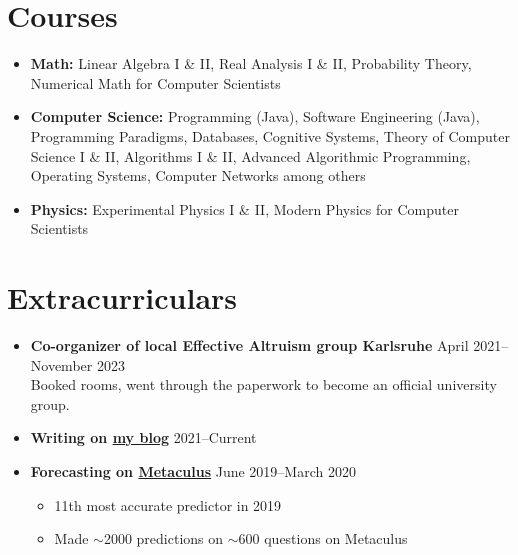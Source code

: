 \documentclass[letterpaper, 9pt]{article}
\begin{document}
\section*{Courses}
\begin{itemize}
    \item \textbf{Math:} Linear Algebra I \& II, Real Analysis I \& II, Probability Theory, Numerical Math for Computer Scientists
    \item \textbf{Computer Science:} Programming (Java), Software Engineering (Java), Programming Paradigms, Databases, Cognitive Systems, Theory of Computer Science I \& II, Algorithms I \& II, Advanced Algorithmic Programming, Operating Systems, Computer Networks among others
    \item \textbf{Physics:} Experimental Physics I \& II, Modern Physics for Computer Scientists
\end{itemize}


\section*{Extracurriculars}
  \begin{itemize}
      \item {\textbf{Co-organizer of local Effective Altruism group Karlsruhe}} \hfill April 2021--November 2023 \\
      {Booked rooms, went through the paperwork to become an official university group.}
      \item {\textbf{Writing on \href{https://www.tassiloneubauer.com/}{my blog}}} \hfill 2021--Current
      \item \textbf{Forecasting on \href{https://www.metaculus.com/accounts/profile/106992/}{Metaculus}} \hfill June 2019--March 2020
      \begin{itemize}
              \item 11th most accurate predictor in 2019
              \item Made $\sim$2000 predictions on $\sim$600 questions on Metaculus
      \end{itemize}
  \end{itemize}
\end{document}
